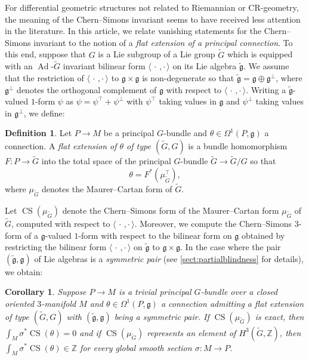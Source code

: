 \documentclass[british,11pt,a4paper]{amsart}
\numberwithin{equation}{section}
\newcommand{\B}[2]{\langle#1,#2\rangle}
\newcommand{\CS}{\operatorname{CS}}
\newcommand{\Ad}{\operatorname{Ad}}
\newcommand{\Z}{\mathbb{Z}}
\newcounter{theorem}
\numberwithin{theorem}{section}
\newtheorem{cor}[theorem]{Corollary}
\theoremstyle{definition}
\newtheorem{definition}[theorem]{Definition}
\theoremstyle{remark}
\begin{document}
For differential geometric structures not related to Riemannian or CR-geometry, the meaning of the Chern--Simons invariant seems to have received less attention in the literature. In this article, we relate vanishing statements for the Chern--Simons invariant to the notion of a \emph{flat extension of a principal connection}. To this end, suppose that $G$ is a Lie subgroup of a Lie group $\tilde{G}$ which is equipped with an $\Ad$-$\tilde{G}$ invariant bilinear form $\B{\,\cdot\,}{\cdot\,}$ on its Lie algebra $\tilde{\mathfrak{g}}$. We assume that the restriction of $\B{\,\cdot\,}{\cdot\,}$ to $\mathfrak{g}\times \mathfrak{g}$ is non-degenerate so that $\tilde{\mathfrak{g}}=\mathfrak{g}\oplus \mathfrak{g}^{\perp}$, where $\mathfrak{g}^{\perp}$ denotes the orthogonal complement of $\mathfrak{g}$ with respect to $\B{\,\cdot\,}{\cdot\,}$. Writing a $\tilde{\mathfrak{g}}$-valued $1$-form $\psi$ as $\psi=\psi^{\top}+\psi^{\perp}$ with $\psi^{\top}$ taking values in $\mathfrak{g}$ and $\psi^{\perp}$ taking values in $\mathfrak{g}^{\perp}$, we define:
\begin{definition}\label{defn:flatext}
Let $P \to M$ be a principal $G$-bundle and $\theta \in \Omega^1(P,\mathfrak{g})$ a connection. A \emph{flat extension of $\theta$ of type $(\tilde{G},G)$} is a bundle homomorphism $F : P \to \tilde{G}$ into the total space of the principal $G$-bundle $\tilde{G} \to \tilde{G}/G$ so that
\[
\theta=F^*(\mu_{\tilde{G}}^{\top}),
\]
where $\mu_{\tilde{G}}$ denotes the Maurer--Cartan form of $\tilde{G}$. 
\end{definition} 
Let $\CS(\mu_{\tilde G})$ denote the Chern--Simons form of the Maurer--Cartan form $\mu_{\tilde G}$ of $\tilde{G}$, computed with respect to $\B{\,\cdot\,}{\cdot\,}$. Moreover, we compute the Chern--Simons $3$-form of a $\mathfrak{g}$-valued $1$-form with respect to the bilinear form on $\mathfrak{g}$ obtained by restricting the bilinear form $\B{\,\cdot\,}{\cdot\,}$ on $\tilde{\mathfrak{g}}$ to $\mathfrak{g}\times \mathfrak{g}$. In the case where the pair $(\tilde{\mathfrak{g}},\mathfrak{g})$ of Lie algebras is a \emph{symmetric pair} (see \cref{sect:partialblindness} for details), we obtain:
\begin{cor}\label{cor:keystatement}
Suppose $P \to M$ is a trivial principal $G$-bundle over a closed oriented $3$-manifold $M$ and $\theta \in \Omega^1(P,\mathfrak{g})$ a connection admitting a flat extension of type $(\tilde{G},G)$ with $(\tilde{\mathfrak{g}},\mathfrak{g})$ being a symmetric pair. If $\CS(\mu_{\tilde{G}})$ is exact, then $\int_M\sigma^*\CS(\theta)=0$ and if $\CS(\mu_{\tilde{G}})$ represents an element of $H^3(\tilde{G},\Z)$, then $\int_M\sigma^*\CS(\theta) \in \Z$ for every global smooth section $\sigma : M \to P$.
\end{cor}
\end{document}
